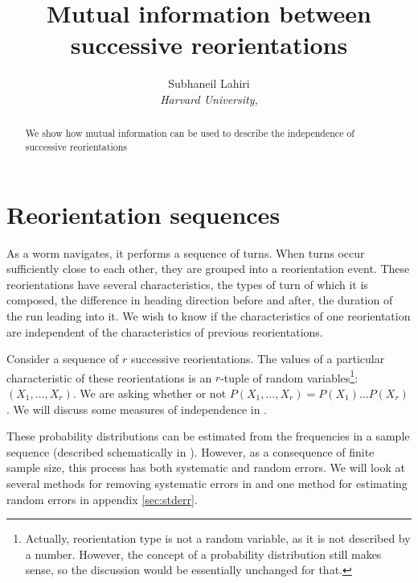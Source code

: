 \documentclass[12pt]{article}
\title{Mutual information between successive reorientations}
\author{Subhaneil Lahiri
\\
%
%
\small{\emph{Harvard University,}}
%
}
\begin{document}
\maketitle





\begin{abstract}
  We show how mutual information can be used to describe the independence of successive reorientations
\end{abstract}



\section{Reorientation sequences}\label{sec:reoseq}

As a worm navigates, it performs a sequence of turns. When turns occur sufficiently close to each other, they are grouped into a reorientation event. These reorientations have several characteristics, \eg the types of turn of which it is composed, the difference in heading direction before and after, the duration of the run leading into it. We wish to know if the characteristics of one reorientation are independent of the characteristics of previous reorientations.

Consider a sequence of $r$ successive reorientations. The values of a particular characteristic of these reorientations is an $r$-tuple of random variables\footnote{ Actually, reorientation type is not a random variable, as it is not described by a number. However, the concept of a probability distribution still makes sense, so the discussion would be essentially unchanged for that. }: $(X_1,\ldots,X_r)$. We are asking whether or not $P(X_1,\ldots,X_r) = P(X_1)\ldots P(X_r)$. We will discuss some measures of independence in .

These probability distributions can be estimated from the frequencies in a sample sequence (described schematically in ). However, as a consequence of finite sample size, this process has both systematic and random errors. We will look at several methods for removing systematic errors in  and one method for estimating random errors in appendix \ref{sec:stderr}.
\end{document}
